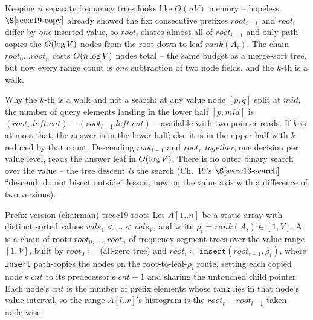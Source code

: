 Keeping \(n\) separate frequency trees looks like \(O(nV)\) memory -- hopeless. \(\secref{c19-copy}\) already showed the fix: consecutive prefixes \(\mathit{root}_{i-1}\) and \(\mathit{root}_i\) differ by \emph{one} inserted value, so \(\mathit{root}_i\) shares almost all of \(\mathit{root}_{i-1}\) and only path-copies the \(O(\log V)\) nodes from the root down to leaf \(\mathit{rank}(A_i)\). The chain \(\mathit{root}_0\dots\mathit{root}_n\) costs \(O(n\log V)\) nodes total -- the same budget as a merge-sort tree, but now every range count is \emph{one} subtraction of two node fields, and the \(k\)-th is a walk.

Why the \(k\)-th is a walk and not a search: at any value node \([p,q]\) split at \(\mathit{mid}\), the number of query elements landing in the lower half \([p,\mathit{mid}]\) is \((\mathit{root}_r.\mathit{left}.\mathit{cnt})-(\mathit{root}_{l-1}.\mathit{left}.\mathit{cnt})\) -- available with two pointer reads. If \(k\) is at most that, the answer is in the lower half; else it is in the upper half with \(k\) reduced by that count. Descending \(\mathit{root}_{l-1}\) and \(\mathit{root}_r\) \emph{together}, one decision per value level, reads the answer leaf in \(O(\log V)\). There is no outer binary search over the value -- the tree descent \emph{is} the search (Ch.~19's \(\secref{c13-search}\) ``descend, do not bisect outside'' lesson, now on the value axis with a difference of two versions).

\begin{definition}{Prefix-version (chairman) tree}{c19-roots}
Let \(A[1..n]\) be a static array with distinct sorted values \(\mathit{vals}_1<\dots<\mathit{vals}_V\), and write \(\rho_i=\mathit{rank}(A_i)\in[1,V]\). A  is a chain of roots \(\mathit{root}_0,\dots,\mathit{root}_n\) of frequency segment trees over the value range \([1,V]\), built by \(\mathit{root}_0\coloneqq\) (all-zero tree) and \(\mathit{root}_i\coloneqq\texttt{insert}(\mathit{root}_{i-1},\rho_i)\), where \texttt{insert} path-copies the nodes on the root-to-leaf-\(\rho_i\) route, setting each copied node's \(\mathit{cnt}\) to its predecessor's \(\mathit{cnt}+1\) and sharing the untouched child pointer. Each node's \(\mathit{cnt}\) is the number of prefix elements whose rank lies in that node's value interval, so the range \(A[l..r]\)'s histogram is the  \(\mathit{root}_r-\mathit{root}_{l-1}\) taken node-wise.
\end{definition}

